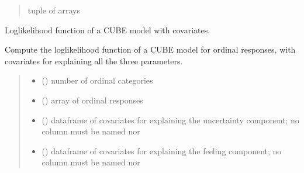 \documentclass[letterpaper,10pt,english]{sphinxmanual}
\begin{document}
\begin{fulllineitems}
\begin{quote}
\begin{description}
\sphinxAtStartPar
tuple of arrays

\end{description}\end{quote}

\end{fulllineitems}


\begin{fulllineitems}
\label{\detokenize{cubmods:cubmods.cube_ywz.loglik}}
\pysigstartsignatures
{}
\pysigstopsignatures
\sphinxAtStartPar
Log\sphinxhyphen{}likelihood function of a CUBE model with covariates.

\sphinxAtStartPar
Compute the log\sphinxhyphen{}likelihood function of a CUBE model for ordinal responses,
with covariates for explaining all the three parameters.
\begin{quote}\begin{description}
\begin{itemize}
\item {} 
\sphinxAtStartPar
{} () \textendash{} number of ordinal categories

\item {} 
\sphinxAtStartPar
{} () \textendash{} array of ordinal responses

\item {} 
\sphinxAtStartPar
{} () \textendash{} dataframe of covariates for explaining the uncertainty component;
no column must be named  nor 

\item {} 
\sphinxAtStartPar
{} () \textendash{} dataframe of covariates for explaining the feeling component;
no column must be named  nor 


\end{itemize}
\end{description}
\end{quote}
\end{fulllineitems}
\end{document}
